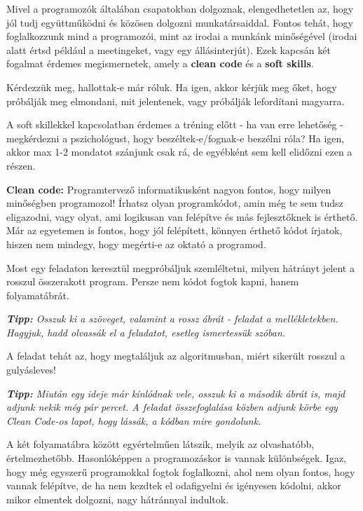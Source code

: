 \documentclass[../Main.tex]{subfiles}
\begin{document}
Mivel a programozók általában csapatokban dolgoznak, elengedhetetlen az, hogy jól tudj együttműködni és közösen dolgozni munkatársaiddal.
Fontos tehát, hogy foglalkozzunk mind a programozói, mint az irodai a munkánk minőségével (irodai alatt értsd például a meetingeket, vagy egy állásinterjút).
Ezek kapcsán két fogalmat érdemes megismernetek, amely a \textbf{clean code} és a \textbf{soft skills}.

Kérdezzük meg, hallottak-e már róluk.
Ha igen, akkor kérjük meg őket, hogy próbálják meg elmondani, mit jelentenek, vagy próbálják lefordítani magyarra.

A soft skillekkel kapcsolatban érdemes a tréning előtt - ha van erre lehetőség - megkérdezni a pszichológust, hogy beszéltek-e/fognak-e beszélni róla? Ha igen, akkor max 1-2 mondatot szánjunk csak rá, de egyébként sem kell elidőzni ezen a részen.

\textbf{Clean code:}
Programtervező informatikusként nagyon fontos, hogy milyen minőségben programozol!
Írhatsz olyan programkódot, amin még te sem tudsz eligazodni, vagy olyat, ami logikusan van felépítve és más fejlesztőknek is érthető.
Már az egyetemen is fontos, hogy jól felépített, könnyen érthető kódot írjatok, hiszen nem mindegy, hogy megérti-e az oktató a programod.

Most egy feladaton keresztül megpróbáljuk szemléltetni, milyen hátrányt jelent a rosszul összerakott program.
Persze nem kódot fogtok kapni, hanem folyamatábrát.

\textit{\textbf{Tipp:}
Osszuk ki a szöveget, valamint a rossz ábrát - feladat a mellékletekben.
Hagyjuk, hadd olvassák el a feladatot, esetleg ismertessük szóban.
}

A feladat tehát az, hogy megtaláljuk az algoritmusban, miért sikerült rosszul a gulyásleves!

\textit{\textbf{Tipp:}
Miután egy ideje már kínlódnak vele, osszuk ki a második ábrát is, majd adjunk nekik még pár percet.
A feladat összefoglalása közben adjunk körbe egy Clean Code-os lapot, hogy lássák, a kódban mire gondolunk.
}

A két folyamatábra között egyértelműen látszik, melyik az olvashatóbb, értelmezhetőbb.
Hasonlóképpen a programozáskor is vannak különbségek.
Igaz, hogy még egyszerű programokkal fogtok foglalkozni, ahol nem olyan fontos, hogy vannak felépítve, de ha nem kezdtek el odafigyelni és igényesen kódolni, akkor mikor elmentek dolgozni, nagy hátránnyal indultok.

\end{document}
